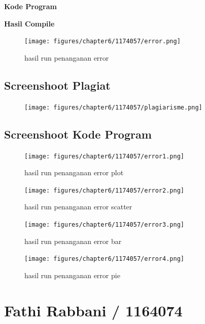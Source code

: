 		\hfill \break
		\textbf{Kode Program}

		

		\hfill \break
		\textbf{Hasil Compile}

		\begin{figure}[H]
			\texttt{[image: figures/chapter6/1174057/error.png]}
			\centering
			\caption{hasil run penanganan error}
		\end{figure}
		
		\subsection{Screenshoot Plagiat}
		\begin{figure}[H]
			\texttt{[image: figures/chapter6/1174057/plagiarisme.png]}
			\centering
		\end{figure}
		
		\subsection{Screenshoot Kode Program}
		
		\begin{figure}[H]
			\texttt{[image: figures/chapter6/1174057/error1.png]}
			\centering
			\centering
			\caption{hasil run penanganan error plot}
		\end{figure}
		\begin{figure}[H]
			\texttt{[image: figures/chapter6/1174057/error2.png]}
			\centering
			\centering
			\caption{hasil run penanganan error scatter}
		\end{figure}
		\begin{figure}[H]
			\texttt{[image: figures/chapter6/1174057/error3.png]}
			\centering
			\centering
			\caption{hasil run penanganan error bar}
		\end{figure}
		\begin{figure}[H]
			\texttt{[image: figures/chapter6/1174057/error4.png]}
			\centering
			\centering
			\caption{hasil run penanganan error pie}
		\end{figure}
		
\section{Fathi Rabbani / 1164074}

